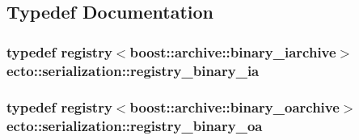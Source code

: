 \subsection{Typedef Documentation}
\hypertarget{namespaceecto_1_1serialization_a465425ff3a756de86571c1262f22d2ba}{
\subsubsection[{registry\-\_\-binary\-\_\-ia}]{\setlength{\rightskip}{0pt plus 5cm}typedef {\bf registry}$<$boost\-::archive\-::binary\-\_\-iarchive$>$ {\bf ecto\-::serialization\-::registry\-\_\-binary\-\_\-ia}}}\label{namespaceecto_1_1serialization_a465425ff3a756de86571c1262f22d2ba}
\hypertarget{namespaceecto_1_1serialization_ad544c8b5416e0ecfe692922b2f2e8e54}{
\subsubsection[{registry\-\_\-binary\-\_\-oa}]{\setlength{\rightskip}{0pt plus 5cm}typedef {\bf registry}$<$boost\-::archive\-::binary\-\_\-oarchive$>$ {\bf ecto\-::serialization\-::registry\-\_\-binary\-\_\-oa}}}\label{namespaceecto_1_1serialization_ad544c8b5416e0ecfe692922b2f2e8e54}


